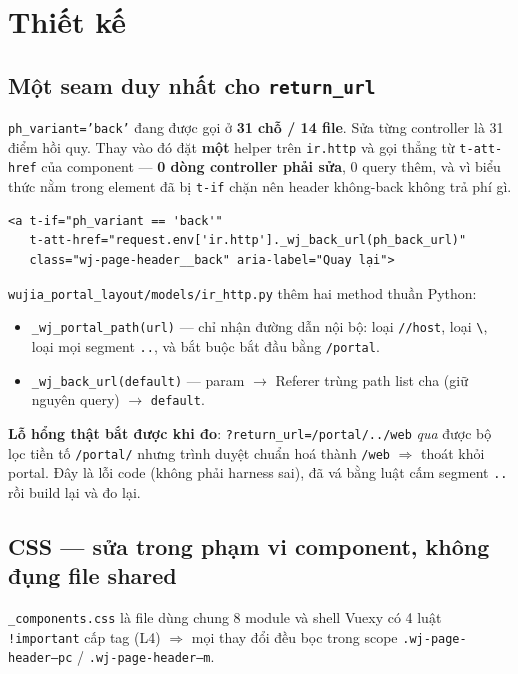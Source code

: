 \section{Thiết kế}

\subsection{Một seam duy nhất cho \texttt{return\_url}}

\texttt{ph\_variant='back'} đang được gọi ở \textbf{31 chỗ / 14 file}. Sửa từng controller là
31 điểm hồi quy. Thay vào đó đặt \textbf{một} helper trên \texttt{ir.http} và gọi thẳng từ
\texttt{t-att-href} của component --- \textbf{0 dòng controller phải sửa}, 0 query thêm, và vì
biểu thức nằm trong element đã bị \texttt{t-if} chặn nên header không-back không trả phí gì.

\begin{verbatim}
<a t-if="ph_variant == 'back'"
   t-att-href="request.env['ir.http']._wj_back_url(ph_back_url)"
   class="wj-page-header__back" aria-label="Quay lại">
\end{verbatim}

\texttt{wujia\_portal\_layout/models/ir\_http.py} thêm hai method thuần Python:

\begin{itemize}
\item \texttt{\_wj\_portal\_path(url)} --- chỉ nhận đường dẫn nội bộ: loại \texttt{//host},
  loại \texttt{\textbackslash}, loại mọi segment \texttt{..}, và bắt buộc bắt đầu bằng
  \texttt{/portal}.
\item \texttt{\_wj\_back\_url(default)} --- param $\rightarrow$ Referer trùng path list cha
  (giữ nguyên query) $\rightarrow$ \texttt{default}.
\end{itemize}

\textbf{Lỗ hổng thật bắt được khi đo}: \texttt{?return\_url=/portal/../web} \emph{qua} được bộ
lọc tiền tố \texttt{/portal/} nhưng trình duyệt chuẩn hoá thành \texttt{/web} $\Rightarrow$
thoát khỏi portal. Đây là lỗi code (không phải harness sai), đã vá bằng luật cấm segment
\texttt{..} rồi build lại và đo lại.

\subsection{CSS --- sửa trong phạm vi component, không đụng file shared}

\texttt{\_components.css} là file dùng chung 8 module và shell Vuexy có 4 luật
\texttt{!important} cấp tag (L4) $\Rightarrow$ mọi thay đổi đều bọc trong scope
\texttt{.wj-page-header--pc} / \texttt{.wj-page-header--m}.

